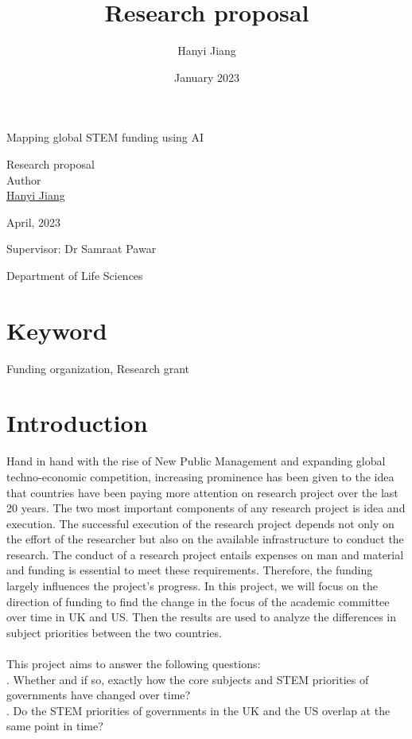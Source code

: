 \documentclass[a4paper,12pt]{article}
\author{Hanyi Jiang}
\title{Research proposal}
\date{January 2023}
\begin{document}
	
	\begin{center}
	\thispagestyle{empty}
		\begin{LARGE}
		Mapping global STEM funding using AI  \\[1 cm] \vfill
		\end{LARGE}
			
			
		\begin{Large}
			Research proposal \\ [1 cm]\vfill
			Author \\
			\href{mailto:<email>}{Hanyi Jiang} \\[1 cm]\vfill
			
			
			April, 2023\\[1 cm]\vfill
			
			Supervisor: Dr Samraat Pawar \\ 
			\vfill
			
			Department of Life Sciences  \\
		
            
			
		\end{Large}
	\end{center}
	
	\newpage
    \section{Keyword}
    Funding organization, Research grant

    \section{Introduction}
	Hand in hand with the rise of New Public Management and expanding global techno-economic competition, increasing prominence has been given to the idea that countries have been paying more attention on research project over the last 20 years. \cite{sargent2017global} The two most important components of any research project is idea and execution. The successful execution of the research project depends not only on the effort of the researcher but also on the available infrastructure to conduct the research. The conduct of a research project entails expenses on man and material and funding is essential to meet these requirements. \cite{neema2021research} Therefore, the funding largely influences the project's progress. In this project, we will focus on the direction of funding to find the change in the focus of the academic committee over time in UK and US. Then the results are used to analyze the differences in subject priorities between the two countries. \\
    ~\\
    \indent This project aims to answer the following questions: \\
    . Whether and if so, exactly how the core subjects and STEM priorities of governments have changed over time? \\
    . Do the STEM priorities of governments in the UK and the US overlap at the same point in time?\\
    
\end{document}
